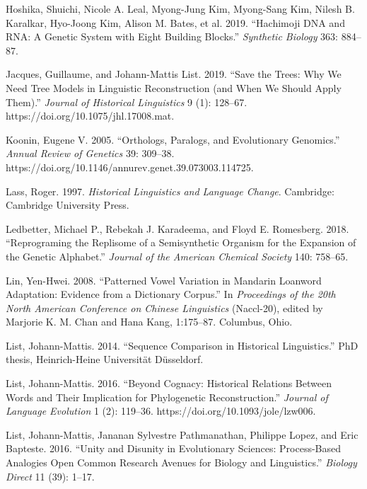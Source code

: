 \documentclass[
  a4paper,
  14pt,
  oneside,
  tablecaptionabove
]{scrbook}
\begin{document}
\nopagebreak\hangindent=0.7cm {\small  Hoshika, Shuichi, Nicole A. Leal, Myong-Jung Kim, Myong-Sang Kim, Nilesh B. Karalkar, Hyo-Joong Kim, Alison M. Bates, et al. 2019.
\enquote{Hachimoji DNA and RNA: A Genetic System with Eight Building Blocks.}
\emph{Synthetic Biology} 363: 884–87.}

\nopagebreak\hangindent=0.7cm {\small  Jacques, Guillaume, and Johann-Mattis List. 2019.
\enquote{Save the Trees: Why We Need Tree Models in Linguistic Reconstruction (and When We Should Apply Them).}
\emph{Journal of Historical Linguistics} 9 (1): 128–67. https://doi.org/10.1075/jhl.17008.mat.}

\nopagebreak\hangindent=0.7cm {\small  Koonin, Eugene V. 2005.
\enquote{Orthologs, Paralogs, and Evolutionary Genomics.}
\emph{Annual Review of Genetics} 39: 309–38. https://doi.org/10.1146/annurev.genet.39.073003.114725.}

\nopagebreak\hangindent=0.7cm {\small  Lass, Roger. 1997.
\emph{Historical Linguistics and Language Change}. Cambridge: Cambridge University Press.}

\nopagebreak\hangindent=0.7cm {\small  Ledbetter, Michael P., Rebekah J. Karadeema, and Floyd E. Romesberg. 2018.
\enquote{Reprograming the Replisome of a Semisynthetic Organism for the Expansion of the Genetic Alphabet.}
\emph{Journal of the American Chemical Society} 140: 758–65.}

\nopagebreak\hangindent=0.7cm {\small  Lin, Yen-Hwei. 2008.
\enquote{Patterned Vowel Variation in Mandarin Loanword Adaptation: Evidence from a Dictionary Corpus.} In
\emph{Proceedings of the 20th North American Conference on Chinese Linguistics} (Naccl-20), edited by Marjorie K. M. Chan and Hana Kang, 1:175–87. Columbus, Ohio.}

\nopagebreak\hangindent=0.7cm {\small  List, Johann-Mattis. 2014.
\enquote{Sequence Comparison in Historical Linguistics.} PhD thesis, Heinrich-Heine Universität Düsseldorf.}

\nopagebreak\hangindent=0.7cm {\small  List, Johann-Mattis. 2016.
\enquote{Beyond Cognacy: Historical Relations Between Words and Their Implication for Phylogenetic Reconstruction.}
\emph{Journal of Language Evolution} 1 (2): 119–36. https://doi.org/10.1093/jole/lzw006.}

\nopagebreak\hangindent=0.7cm {\small  List, Johann-Mattis, Jananan Sylvestre Pathmanathan, Philippe Lopez, and Eric Bapteste. 2016.
\enquote{Unity and Disunity in Evolutionary Sciences: Process-Based Analogies Open Common Research Avenues for Biology and Linguistics.}
\emph{Biology Direct} 11 (39): 1–17.}
\end{document}
